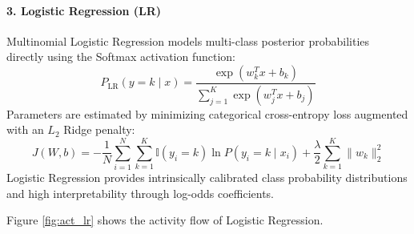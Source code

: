 \paragraph{3. Logistic Regression (LR)}
Multinomial Logistic Regression models multi-class posterior probabilities directly using the Softmax activation function:
\begin{equation}
P_{\text{LR}}(y = k \mid x) = \frac{\exp(w_k^T x + b_k)}{\sum_{j=1}^{K} \exp(w_j^T x + b_j)}
\end{equation}
Parameters are estimated by minimizing categorical cross-entropy loss augmented with an $L_2$ Ridge penalty:
\begin{equation}
J(W, b) = -\frac{1}{N} \sum_{i=1}^{N} \sum_{k=1}^{K} \mathbb{I}(y_i = k) \ln P(y_i = k \mid x_i) + \frac{\lambda}{2} \sum_{k=1}^{K} \|w_k\|_2^2
\end{equation}
Logistic Regression provides intrinsically calibrated class probability distributions and high interpretability through log-odds coefficients.

Figure \ref{fig:act_lr} shows the activity flow of Logistic Regression.

